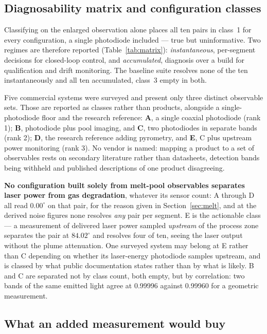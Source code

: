 \documentclass[preprint,times]{elsarticle}
\begin{document}
\subsection{Diagnosability matrix and configuration classes}

Classifying on the enlarged observation alone places all ten pairs in class~1 for
every configuration, a single photodiode included --- true but uninformative. Two
regimes are therefore reported (Table~\ref{tab:matrix}): \emph{instantaneous},
per-segment decisions for closed-loop control, and \emph{accumulated}, diagnosis
over a build for qualification and drift monitoring. The baseline suite resolves none of the ten instantaneously and all ten
accumulated, class~3 empty in both.

Five commercial systems were surveyed and present only three distinct
observable sets. Those are reported as classes rather than products, alongside
a single-photodiode floor and the research reference: \textbf{A}, a single
coaxial photodiode (rank 1); \textbf{B}, photodiode plus pool imaging, and
\textbf{C}, two photodiodes in separate bands (rank 2); \textbf{D}, the research
reference adding pyrometry, and \textbf{E}, C plus upstream power monitoring
(rank 3). No vendor is named: mapping a product to a set of observables rests on
secondary literature rather than datasheets, detection bands being withheld and
published descriptions of one product disagreeing.

\textbf{No configuration built solely from melt-pool observables separates laser
power from gas degradation}, whatever its sensor count: A through D all read
$0.00^\circ$ on that pair, for the reason given in Section~\ref{sec:melt}, and at
the derived noise figures none resolves \emph{any} pair per segment. E is the
actionable class --- a measurement of delivered laser power sampled
\emph{upstream} of the process zone separates the pair at $84.02^\circ$ and
resolves four of ten, seeing the laser output without the plume attenuation. One
surveyed system may belong at E rather than C depending on whether its
laser-energy photodiode samples upstream, and is classed by what public
documentation states rather than by what is likely. B and C are separated not by
class count, both empty, but by correlation: two bands of the same emitted light
agree at 0.99996 against 0.99960 for a geometric measurement.

\subsection{What an added measurement would buy}
\label{sec:added}
\end{document}
